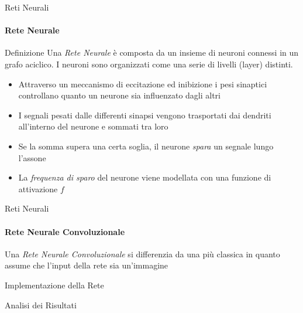 \documentclass[
 ]{beamer}
\begin{document}
\begin{frame}{Reti Neurali}
    \framesubtitle{Rete Neurale}
    
    \begin{block}{Definizione} 
        \large Una \emph{Rete Neurale} è composta da un insieme di neuroni connessi in un grafo aciclico. I neuroni sono organizzati come una serie di livelli (layer) distinti.
    \end{block}\pause
    \begin{itemize} [<+->]
        \setlength\itemsep{2em}
        \item \large Attraverso un meccanismo di eccitazione ed inibizione i pesi sinaptici controllano quanto un neurone sia influenzato dagli altri
       \item \large I segnali pesati dalle differenti sinapsi vengono trasportati dai dendriti all'interno del neurone e sommati tra loro
       \item \large Se la somma supera una certa soglia, il neurone \emph{spara} un segnale lungo l'assone 
       \item \large La \emph{frequenza di sparo} del neurone viene modellata con una funzione di attivazione $f$       
    \end{itemize}
\end{frame}




\begin{frame}{Reti Neurali}
    \framesubtitle{Rete Neurale Convoluzionale}  
    Una \emph{Rete Neurale Convoluzionale} si differenzia da una più classica in quanto assume che l'input della rete sia un'immagine
\end{frame}   

\begin{frame}[c]
  \centering
  \bigskip \bigskip    
  \Huge Implementazione della Rete
\end{frame}

\begin{frame}[c]
  \centering
  \bigskip \bigskip    
  \Huge Analisi dei Risultati
\end{frame}
\end{document}
